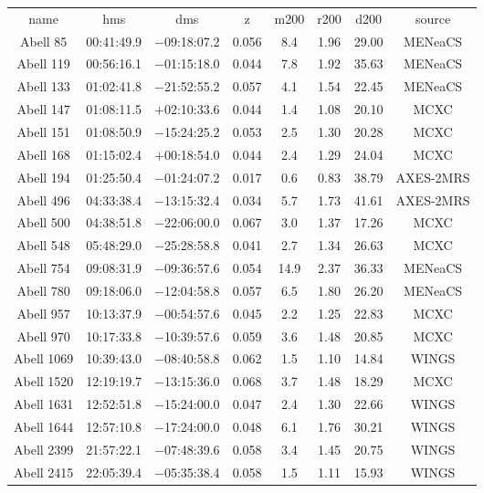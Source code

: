 \begin{table}
\begin{tabular}{cccccccc}
name & hms & dms & z & m200 & r200 & d200 & source \\
Abell 85 & 00:41:49.9 & $-$09:18:07.2 & 0.056 & 8.4 & 1.96 & 29.00 & MENeaCS \\
Abell 119 & 00:56:16.1 & $-$01:15:18.0 & 0.044 & 7.8 & 1.92 & 35.63 & MENeaCS \\
Abell 133 & 01:02:41.8 & $-$21:52:55.2 & 0.057 & 4.1 & 1.54 & 22.45 & MENeaCS \\
Abell 147 & 01:08:11.5 & $+$02:10:33.6 & 0.044 & 1.4 & 1.08 & 20.10 & MCXC \\
Abell 151 & 01:08:50.9 & $-$15:24:25.2 & 0.053 & 2.5 & 1.30 & 20.28 & MCXC \\
Abell 168 & 01:15:02.4 & $+$00:18:54.0 & 0.044 & 2.4 & 1.29 & 24.04 & MCXC \\
Abell 194 & 01:25:50.4 & $-$01:24:07.2 & 0.017 & 0.6 & 0.83 & 38.79 & AXES-2MRS \\
Abell 496 & 04:33:38.4 & $-$13:15:32.4 & 0.034 & 5.7 & 1.73 & 41.61 & AXES-2MRS \\
Abell 500 & 04:38:51.8 & $-$22:06:00.0 & 0.067 & 3.0 & 1.37 & 17.26 & MCXC \\
Abell 548 & 05:48:29.0 & $-$25:28:58.8 & 0.041 & 2.7 & 1.34 & 26.63 & MCXC \\
Abell 754 & 09:08:31.9 & $-$09:36:57.6 & 0.054 & 14.9 & 2.37 & 36.33 & MENeaCS \\
Abell 780 & 09:18:06.0 & $-$12:04:58.8 & 0.057 & 6.5 & 1.80 & 26.20 & MENeaCS \\
Abell 957 & 10:13:37.9 & $-$00:54:57.6 & 0.045 & 2.2 & 1.25 & 22.83 & MCXC \\
Abell 970 & 10:17:33.8 & $-$10:39:57.6 & 0.059 & 3.6 & 1.48 & 20.85 & MCXC \\
Abell 1069 & 10:39:43.0 & $-$08:40:58.8 & 0.062 & 1.5 & 1.10 & 14.84 & WINGS \\
Abell 1520 & 12:19:19.7 & $-$13:15:36.0 & 0.068 & 3.7 & 1.48 & 18.29 & MCXC \\
Abell 1631 & 12:52:51.8 & $-$15:24:00.0 & 0.047 & 2.4 & 1.30 & 22.66 & WINGS \\
Abell 1644 & 12:57:10.8 & $-$17:24:00.0 & 0.048 & 6.1 & 1.76 & 30.21 & WINGS \\
Abell 2399 & 21:57:22.1 & $-$07:48:39.6 & 0.058 & 3.4 & 1.45 & 20.75 & WINGS \\
Abell 2415 & 22:05:39.4 & $-$05:35:38.4 & 0.058 & 1.5 & 1.11 & 15.93 & WINGS \\

\end{tabular}
\end{table}
